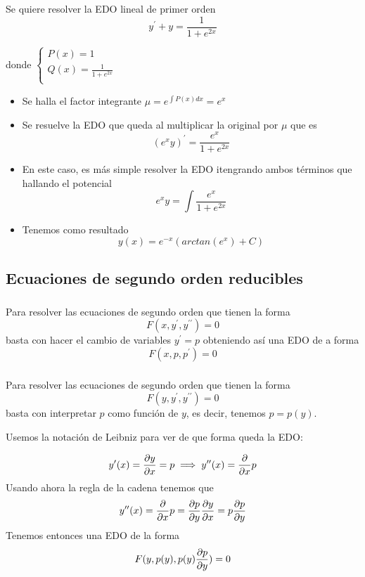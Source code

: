 \documentclass{mathnotes}
\begin{document}
\begin{example}
Se quiere resolver la EDO lineal de primer orden 
$$y^\prime + y = \frac{1}{1+e^{2x}}$$

donde 
$
  \left\lbrace
  \begin{array}{l}
     P(x) = 1 \\
     Q(x) = \frac{1}{1+e^{2x}} \\
  \end{array}
  \right.
$

\begin{itemize}
\item Se halla el factor integrante $\mu = e^{\int P(x)dx} = e^x$
\item Se resuelve la EDO que queda al multiplicar la original por $\mu$ que es
$$(e^xy)^\prime = \frac{e^x}{1+e^{2x}}$$
\item En este caso, es más simple resolver la EDO itengrando ambos términos que hallando el potencial
$$e^xy=\int \frac{e^x}{1+e^{2x}}$$
\item Tenemos como resultado
$$y(x) = e^{-x}(arctan (e^x) + C)$$
\end{itemize}
\end{example}

\subsection{Ecuaciones de segundo orden reducibles}
\subsubsection{}
Para resolver las ecuaciones de segundo orden que tienen la forma $$F(x, y^\prime, y^{\prime\prime}) = 0$$ basta con hacer el cambio de variables $y^\prime = p$ obteniendo así una EDO de a forma $$F(x, p, p^\prime) = 0$$

\subsubsection{}
Para resolver las ecuaciones de segundo orden que tienen la forma $$F(y,y^\prime, y^{\prime\prime}) = 0$$ basta con interpretar $p$ como función de $y$, es decir, tenemos $p = p(y)$.

Usemos la notación de Leibniz para ver de que forma queda la EDO:

$$y^\prime(x) = \partialder{x}{y} = p \implies y^{\prime\prime}(x) = \derivative{x}p$$
Usando ahora la regla de la cadena tenemos que 
$$y^{\prime\prime}(x) = \derivative{x}p = \partialder{y}{p}\partialder{x}{y} = p\partialder{y}{p}$$
Tenemos entonces una EDO de la forma $$F(y, p(y), p(y)\partialder{y}{p}) = 0$$
\end{document}
